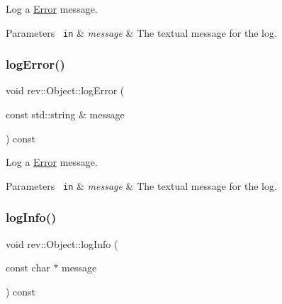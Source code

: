 Log a \mbox{\hyperlink{class_error}{Error}} message. 


\begin{DoxyParams}[1]{Parameters}
\mbox{\texttt{ in}}  & {\em message} & The textual message for the log. \\
\hline
\end{DoxyParams}
\mbox{\label{classrev_1_1_object_a773c27fc0e8e9c911021763c6dba144d}} 
\subsubsection{\texorpdfstring{logError()}{logError()}\hspace{0.1cm}{\footnotesize\ttfamily [2/2]}}
{\footnotesize\ttfamily void rev\+::\+Object\+::log\+Error (\begin{DoxyParamCaption}\item[{const std\+::string \&}]{message }\end{DoxyParamCaption}) const\hspace{0.3cm}{\ttfamily [inline]}}



Log a \mbox{\hyperlink{class_error}{Error}} message. 


\begin{DoxyParams}[1]{Parameters}
\mbox{\texttt{ in}}  & {\em message} & The textual message for the log. \\
\hline
\end{DoxyParams}
\mbox{\label{classrev_1_1_object_a6dd4b6c7863018562f5820bdcac3612c}} 
\subsubsection{\texorpdfstring{logInfo()}{logInfo()}\hspace{0.1cm}{\footnotesize\ttfamily [1/2]}}
{\footnotesize\ttfamily void rev\+::\+Object\+::log\+Info (\begin{DoxyParamCaption}\item[{const char $\ast$}]{message }\end{DoxyParamCaption}) const\hspace{0.3cm}{\ttfamily [inline]}}



